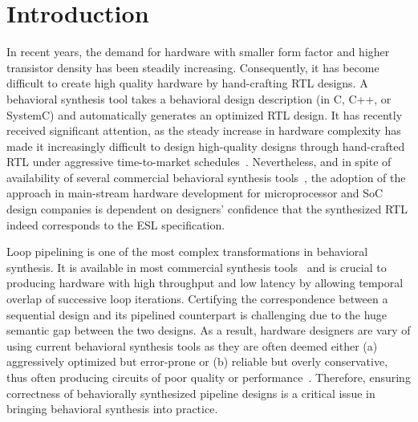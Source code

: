 \section{Introduction}
\label{sec:intro}

In recent years, the demand for hardware with smaller form factor and higher transistor density has been steadily increasing. Consequently, it has become difficult to create high quality hardware by hand-crafting RTL designs. A behavioral synthesis tool takes a behavioral
design description (in C, C++, or SystemC) and automatically generates an optimized RTL design. 
It has recently received significant attention, as the steady 
increase in hardware complexity has made it increasingly 
difficult to design high-quality designs through hand-crafted RTL under 
aggressive time-to-market schedules~\cite{googledecoder}. Nevertheless, and in spite of availability of several
commercial behavioral synthesis tools~\cite{ctos,forte,vivado},
the adoption of the approach in main-stream hardware development for
microprocessor and SoC design companies is dependent on 
designers' confidence that the synthesized RTL indeed corresponds to the ESL
specification. 

Loop pipelining is one of the most complex transformations in behavioral synthesis. It is available in most commercial synthesis tools~\cite{autoesl,forte}
and is
crucial to producing hardware with high throughput and low latency by allowing temporal overlap of successive loop
iterations. Certifying the correspondence between a sequential design and its pipelined counterpart is challenging due to the huge semantic gap between the two
designs. As a result, hardware designers are vary of using current behavioral synthesis tools as
they are often deemed either (a) aggressively optimized but error-prone or (b) 
reliable but overly conservative, thus often producing circuits of poor quality
or performance~\cite{spark,kundu2008}. Therefore, ensuring
correctness of behaviorally synthesized pipeline designs
is a critical issue in bringing behavioral synthesis into practice.

